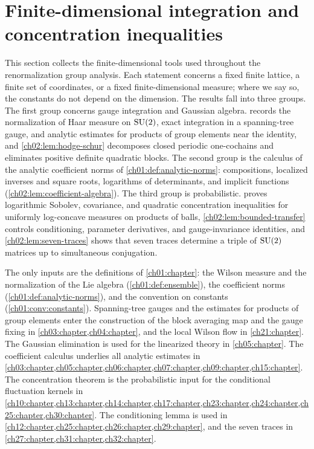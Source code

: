 \chapter{Finite-dimensional integration and concentration inequalities}\label{ch02:chapter}

This section collects the finite-dimensional tools used throughout the renormalization group analysis. Each statement concerns a fixed finite lattice, a finite set of coordinates, or a fixed finite-dimensional measure; where we say so, the constants do not depend on the dimension. The results fall into three groups. The first group concerns gauge integration and Gaussian algebra.  records the normalization of Haar measure on $\mathrm{SU}(2)$, exact integration in a spanning-tree gauge, and analytic estimates for products of group elements near the identity, and \cref{ch02:lem:hodge-schur} decomposes closed periodic one-cochains and eliminates positive definite quadratic blocks. The second group is the calculus of the analytic coefficient norms of \cref{ch01:def:analytic-norms}: compositions, localized inverses and square roots, logarithms of determinants, and implicit functions (\cref{ch02:lem:coefficient-algebra}). The third group is probabilistic.  proves logarithmic Sobolev, covariance, and quadratic concentration inequalities for uniformly log-concave measures on products of balls, \cref{ch02:lem:bounded-transfer} controls conditioning, parameter derivatives, and gauge-invariance identities, and \cref{ch02:lem:seven-traces} shows that seven traces determine a triple of $\mathrm{SU}(2)$ matrices up to simultaneous conjugation.

The only inputs are the definitions of \cref{ch01:chapter}: the Wilson measure and the normalization of the Lie algebra (\cref{ch01:def:ensemble}), the coefficient norms (\cref{ch01:def:analytic-norms}), and the convention on constants (\cref{ch01:conv:constants}). Spanning-tree gauges and the estimates for products of group elements enter the construction of the block averaging map and the gauge fixing in \cref{ch03:chapter,ch04:chapter}, and the local Wilson flow in \cref{ch21:chapter}. The Gaussian elimination is used for the linearized theory in \cref{ch05:chapter}. The coefficient calculus underlies all analytic estimates in \cref{ch03:chapter,ch05:chapter,ch06:chapter,ch07:chapter,ch09:chapter,ch15:chapter}. The concentration theorem is the probabilistic input for the conditional fluctuation kernels in \cref{ch10:chapter,ch13:chapter,ch14:chapter,ch17:chapter,ch23:chapter,ch24:chapter,ch25:chapter,ch30:chapter}. The conditioning lemma is used in \cref{ch12:chapter,ch25:chapter,ch26:chapter,ch29:chapter}, and the seven traces in \cref{ch27:chapter,ch31:chapter,ch32:chapter}.

